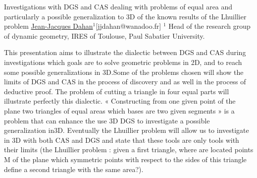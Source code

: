 


\begin{abstract_online}{Investigations with DGS and CAS dealing with problems of equal area and particularly a possible generalization to 3D of the known results of the Lhuillier problem}{%
        \underline{Jean-Jacques Dahan}$^{1}$}{[jjdahan@wanadoo.fr]
        }{%
        $^1$ Head of the research group of dynamic geometry, IRES of Toulouse, Paul Sabatier University.}
    
This presentation aims to illustrate the dialectic between DGS and CAS during investigations which goals are to solve geometric problems in 2D, and to reach some possible generalizations in 3D.Some of the problems chosen will show the limits of DGS and CAS in the process of discovery and as well in the process of deductive proof. The problem of cutting a triangle in four equal parts will illustrate perfectly this dialectic. « Constructing from one given point of the plane two triangles of equal areas which bases are two given segments » is a problem that can enhance the use 3D DGS to investigate a possible generalization in3D. Eventually the Lhuillier problem will allow us to investigate in 3D with both CAS and DGS and state that these tools are only tools with their limits (the Lhuillier problem : given a first triangle, where are located points M of the plane which symmetric points with  respect to the sides of this triangle define a second triangle with the same area?).


\end{abstract_online}
    